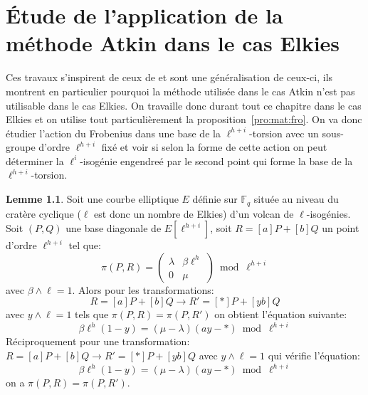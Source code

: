 \documentclass[10pt,a4paper]{book}
\theoremstyle{plain}
\theoremstyle{definition}
\newtheorem{lem}[thm]{Lemme}
\theoremstyle{definition}
\theoremstyle{definition}
\theoremstyle{definition}
\theoremstyle{remark}
\theoremstyle{remark}
\theoremstyle{definition}
\begin{document}
\chapter{\'Etude de l'application de la méthode Atkin dans le cas Elkies}
Ces travaux s'inspirent de ceux de \cite[Chapitre 6]{Master13} et sont une 
généralisation de ceux-ci, ils montrent en particulier pourquoi la méthode 
utilisée dans le cas Atkin n'est pas utilisable dans le cas Elkies. On 
travaille donc durant tout ce chapitre dans le cas Elkies et on utilise tout
particulièrement la proposition~\ref{pro:mat:fro}. On va donc étudier l'action
du Frobenius dans une base de la $\ell^{h+i}$-torsion avec un sous-groupe 
d'ordre $\ell^{h+i}$ fixé et voir si selon la forme de cette action on peut 
déterminer la $\ell^{i}$-isogénie engendreé par le second point qui forme la 
base de la $\ell^{h+i}$-torsion.

\begin{lem} \label{lem:app:eq}
Soit une courbe elliptique $E$ définie sur $\mathbb{F}_q$ située au niveau du
cratère cyclique ($\ell$ est donc un nombre de Elkies) d'un volcan de 
$\ell$-isogénies. Soit $(P,Q)$ une base diagonale de $E[\ell^{h+i}]$, soit 
$R=[a]P+[b]Q$ un point d'ordre $\ell^{h+i}$ tel que:
\begin{equation}
  \label{eq:mat}
 \pi(P,R)= \left(\begin{array}{cc}
      \lambda & \beta \ell^{h}\\
      0 & \mu
    \end{array}\right) \bmod \ell^{h+i}
\end{equation}
avec $\beta \wedge \ell =1$. Alors pour les transformations:
\begin{equation*}
R=[a]P+[b]Q \rightarrow R'=[*]P+[yb]Q
\end{equation*}
avec $y\wedge \ell=1$ tels que $\pi(P,R)=\pi(P,R')$ on obtient l'équation 
suivante:
\[  \beta \ell^h (1-y) = (\mu - \lambda) (ay-*)  \bmod \ell^{h+i} \]
Réciproquement pour une transformation:
$R=[a]P+[b]Q \rightarrow R'=[*]P+[yb]Q$ avec $y \wedge \ell =1$ qui vérifie 
l'équation:
\[   \beta \ell^h (1-y) = (\mu - \lambda) (ay-*)  \bmod \ell^{h+i} \]
 on a $\pi(P,R)=\pi(P,R')$.
\end{lem}
\end{document}
